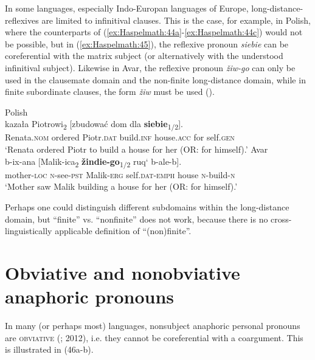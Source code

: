 \documentclass[output=paper]{langscibook}
\begin{document}
In some languages, especially Indo-Europan languages of Europe, long-distance-reflexives are limited to infinitival clauses. This is the case, for example, in Polish, where the counterparts of (\ref{ex:Haspelmath:44a}-\ref{ex:Haspelmath:44c}) would not be possible, but in (\ref{ex:Haspelmath:45}), the reflexive pronoun \textit{siebie} can be coreferential with the matrix subject (or alternatively with the understood infinitival subject). Likewise in Avar, the reflexive pronoun \textit{žiw-go} can only be used in the clausemate domain and the non-finite long-distance domain, while in finite subordinate clauses, the form \textit{žiw} must be used (\citealt[\S2.1]{Rudnev2017}).

\ea%
    \label{ex:Haspelmath:45}
    \ea Polish \label{ex:Haspelmath:45a}\\
       {kazała}  {Piotrowi\textsubscript{2}}  [{zbudować}  {dom}  {dla}  \textbf{{siebie}}{\textsubscript{1/2}}].\\
        Renata.\textsc{nom}  ordered  Piotr.\textsc{dat}  build.\textsc{inf}  house.\textsc{acc}  for  self.\textsc{gen}\\
    \glt‘Renata ordered Piotr to build a house for her (OR: for himself).' \citep[195]{Siewierska2004}
    \ex  Avar \label{ex:Haspelmath:45b}\\
      {b-ix-ana}    [{Malik-ica\textsubscript{2}}  \textbf{{žindie-go}}{\textsubscript{1/2}}  {ruq‘}  {b-ale-b}].\\
    mother-\textsc{loc}  \textsc{n}{}-see-\textsc{pst}  Malik-\textsc{erg}  self.\textsc{dat}{}-\textsc{emph}  house  \textsc{n}{}-build-\textsc{n}\\
    \glt‘Mother saw Malik building a house for her (OR: for himself).’ \citep[159]{Rudnev2017}
    \z
 \z 

     
      

Perhaps one could distinguish different subdomains within the long-distance domain, but “finite” vs. “nonfinite” \citep{Kiparsky2002} does not work, because there is no cross-linguistically applicable definition of “(non)finite”.


\section{Obviative and nonobviative anaphoric pronouns}\label{sec:Haspelmath:10}

In many (or perhaps most) languages, nonsubject anaphoric personal pronouns are \textsc{obviative} (\citealt{Kiparsky2002}; 2012), i.e. they cannot be coreferential with a coargument. This is illustrated in (46a-b).
\end{document}
